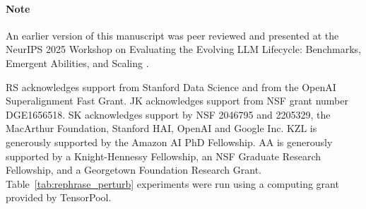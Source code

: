 \begin{ack}

\paragraph{Note} An earlier version of this manuscript was peer reviewed and presented at the NeurIPS 2025 Workshop on Evaluating the Evolving LLM Lifecycle: Benchmarks, Emergent Abilities, and Scaling \citep{schaeffer2025causally}.

RS acknowledges support from Stanford Data Science and from the OpenAI Superalignment Fast Grant. JK acknowledges support from NSF grant number DGE1656518. SK acknowledges support by NSF 2046795 and 2205329, the
MacArthur Foundation, Stanford HAI, OpenAI and Google Inc. KZL is generously supported by the Amazon AI PhD Fellowship. AA is generously supported by a Knight-Hennessy Fellowship, an NSF Graduate Research Fellowship, and a Georgetown Foundation Research Grant.
Table~\ref{tab:rephrase_perturb} experiments were run using a computing grant provided by TensorPool.

\end{ack}
